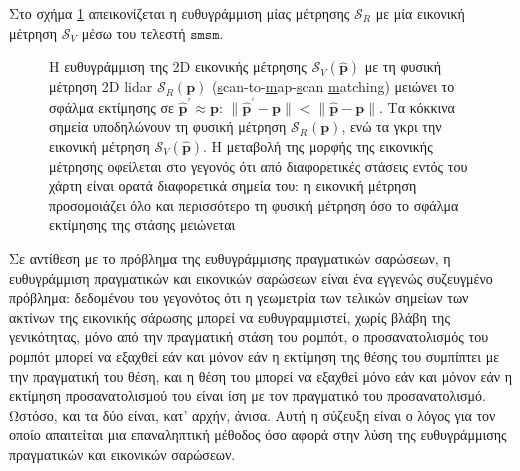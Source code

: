 Στο σχήμα \ref{fig:smsm_principle} απεικονίζεται η ευθυγράμμιση μίας μέτρησης
$\mathcal{S}_R$ με μία εικονική μέτρηση $\mathcal{S}_V$ μέσω του τελεστή
$\texttt{smsm}$.


\begin{figure}[htbp]\centering
  
  \vspace{0.5cm}
  \caption{\small Η ευθυγράμμιση της 2D εικονικής μέτρησης $\mathcal{S}_V(\hat{\bm{p}})$ με
           τη φυσική μέτρηση 2D lidar $\mathcal{S}_R(\bm{p})$
           (\underline{s}can-to-\underline{m}ap-\underline{s}can
           \underline{m}atching) μειώνει το σφάλμα εκτίμησης σε
           $\hat{\bm{p}}^\prime \approx \bm{p}$:
           $\|\hat{\bm{p}}^\prime - \bm{p}\| < \|\hat{\bm{p}}- \bm{p}\|$. Τα
           κόκκινα σημεία υποδηλώνουν τη φυσική μέτρηση $\mathcal{S}_R(\bm{p})$,
           ενώ τα γκρι την εικονική μέτρηση $\mathcal{S}_V(\hat{\bm{p}})$.
           Η μεταβολή της μορφής της εικονικής μέτρησης οφείλεται στο γεγονός
           ότι από διαφορετικές στάσεις εντός του χάρτη είναι ορατά διαφορετικά
           σημεία του: η εικονική μέτρηση προσομοιάζει όλο και περισσότερο
           τη φυσική μέτρηση όσο το σφάλμα εκτίμησης της στάσης μειώνεται}
  \label{fig:smsm_principle}
\end{figure}





\begin{gg_box}
\begin{remark}
\label{rem:iterative}
Σε αντίθεση με το πρόβλημα της ευθυγράμμισης πραγματικών σαρώσεων, η
ευθυγράμμιση πραγματικών και εικονικών σαρώσεων είναι ένα εγγενώς συζευγμένο
πρόβλημα: δεδομένου του γεγονότος ότι η γεωμετρία των τελικών σημείων των
ακτίνων της εικονικής σάρωσης μπορεί να ευθυγραμμιστεί, χωρίς βλάβη της
γενικότητας, μόνο από την πραγματική στάση του ρομπότ, ο προσανατολισμός του
ρομπότ μπορεί να εξαχθεί εάν και μόνον εάν η εκτίμηση της θέσης του συμπίπτει
με την πραγματική του θέση, και η θέση του μπορεί να εξαχθεί μόνο εάν και
μόνον εάν η εκτίμηση προσανατολισμού του είναι ίση με τον πραγματικό του
προσανατολισμό. Ωστόσο, και τα δύο είναι, κατ' αρχήν, άνισα. Αυτή η σύζευξη
είναι ο λόγος για τον οποίο απαιτείται μια επαναληπτική μέθοδος όσο αφορά
στην λύση της ευθυγράμμισης πραγματικών και εικονικών σαρώσεων.
\end{remark}
\end{gg_box}

